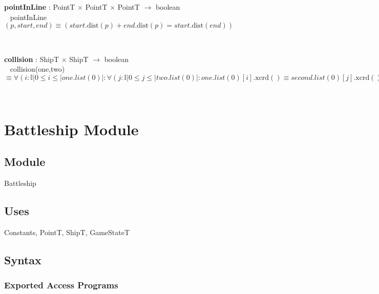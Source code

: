 \documentclass[12pt]{article}
\begin{document}
\textbf{pointInLine} : PointT $\times$ PointT $\times$ PointT $\rightarrow$ boolean\\
~\newline
pointInLine$(p, start, end) \equiv (start.\mbox{dist}(p) + end.\mbox{dist}(p) = start.\mbox{dist}(end))$

~\newline

\noindent \textbf{collision} : ShipT $\times$ ShipT $\rightarrow$ boolean\\
~\newline
collision(one,two) $ \equiv  \forall (i : \mathbb{I} | 0 \leq i \leq |one.list(0)| : \forall (j : \mathbb{I} | 0 \leq j \leq |two.list(0)| : one.list(0)[i].\mbox{xcrd}() \equiv second.list(0)[j].\mbox{xcrd}()  \land one.list(0)[i].\mbox{ycrd}() \equiv second.list(0)[j].\mbox{ycrd}())) $

~\newline
\newpage

\section* {Battleship Module}

\subsection* {Module}

Battleship

\subsection* {Uses}

Constants, PointT, ShipT, GameStateT

\subsection* {Syntax}

\subsubsection* {Exported Access Programs}
\end{document}
